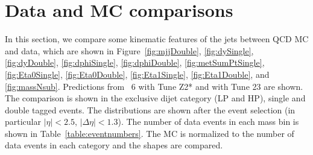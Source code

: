 \newpage
\section{Data and MC comparisons}
\label{sec:data-mc-comp}

In this section, we compare some kinematic features of the jets between QCD MC and data, which are
 shown in Figure~\ref{fig:mjjDouble}, \ref{fig:dySingle}, \ref{fig:dyDouble}, \ref{fig:dphiSingle}, 
\ref{fig:dphiDouble}, \ref{fig:metSumPtSingle},
\ref{fig:Eta0Single}, \ref{fig:Eta0Double}, \ref{fig:Eta1Single}, \ref{fig:Eta1Double},
and \ref{fig:massNsub}.
Predictions from \PYTHIA~6 with Tune Z2* and \HERWIG{++} with Tune 23 are shown.
The comparison is shown in the exclusive dijet category (LP and HP),  single and double tagged events.
The distributions are shown after the event selection (in particular $|\eta| < 2.5$, $|\Delta\eta|<1.3$).
The number of data events in each mass bin is shown in Table~\ref{table:eventnumbers}.
The MC is normalized to the number of data events in each category and the shapes are compared.


